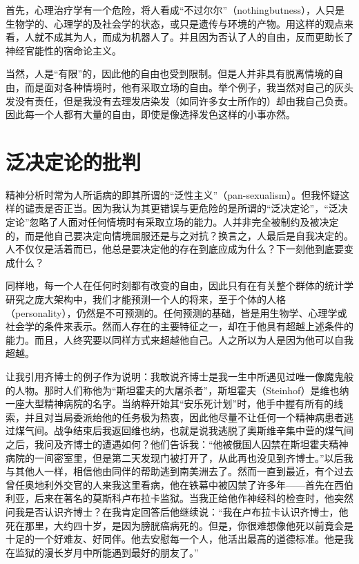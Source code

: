 \documentclass[11pt,oneside]{book}
\begin{document}
\begin{common-format}
首先，心理治疗学有一个危险，将人看成“不过尔尔”（nothingbutness），人只是生物学的、心理学的及社会学的状态，或只是遗传与环境的产物。用这样的观点来看，人就不成其为人，而成为机器人了。并且因为否认了人的自由，反而更助长了神经官能性的宿命论主义。

当然，人是“有限”的，因此他的自由也受到限制。但是人并非具有脱离情境的自由，而是面对各种情境时，他有采取立场的自由。举个例子，我当然对自己的灰头发没有责任，但是我没有去理发店染发（如同许多女士所作的）却由我自己负责。因此每一个人都有大量的自由，即使是像选择发色这样的小事亦然。


\section{泛决定论的批判}
精神分析时常为人所诟病的即其所谓的“泛性主义”（pan-sexualism）。但我怀疑这样的谴责是否正当。因为我认为其更错误与更危险的是所谓的“泛决定论”，“泛决定论”忽略了人面对任何情境时有采取立场的能力。人并非完全被制约及被决定的，而是他自己要决定向情境屈服还是与之对抗？换言之，人最后是自我决定的。人不仅仅是活着而已，他总是要决定他的存在到底应成为什么？下一刻他到底要变成什么？

同样地，每一个人在任何时刻都有改变的自由，因此只有在有关整个群体的统计学研究之庞大架构中，我们才能预测一个人的将来，至于个体的人格（personality），仍然是不可预测的。任何预测的基础，皆是用生物学、心理学或社会学的条件来表示。然而人存在的主要特征之一，却在于他具有超越上述条件的能力。而且，人终究要以同样方式来超越他自己。人之所以为人是因为他可以自我超越。

让我引用齐博士的例子作为说明：我敢说齐博士是我一生中所遇见过唯一像魔鬼般的人物。那时人们称他为“斯坦霍夫的大屠杀者”，斯坦霍夫（Steinhof）是维也纳一座大型精神病院的名字。当纳粹开始其“安乐死计划”时，他手中握有所有的线索，并且对当局委派绐他的任务极为热衷，因此他尽量不让任何一个精神病患者逃过煤气间。战争结束后我返回维也纳，也就是说我逃脱了奥斯维辛集中营的煤气间之后，我问及齐博士的遭遇如何？他们告诉我：“他被俄国人囚禁在斯坦霍夫精神病院的一间密室里，但是第二天发现门被打开了，从此再也没见到齐博士。”以后我与其他人一样，相信他由同伴的帮助逃到南美洲去了。然而一直到最近，有个过去曾任奥地利外交官的人来我这里看病，他在铁幕中被囚禁了许多年——首先在西伯利亚，后来在著名的莫斯科卢布拉卡监狱。当我正给他作神经科的检查时，他突然问我是否认识齐博士？在我肯定回答后他继续说：“我在卢布拉卡认识齐博士，他死在那里，大约四十岁，是因为膀胱癌病死的。但是，你很难想像他死以前竟会是十足的一个好难友、好同伴。他去安慰每一个人，他活出最高的道德标准。他是我在监狱的漫长岁月中所能遇到最好的朋友了。”


\end{common-format}
\end{document}

